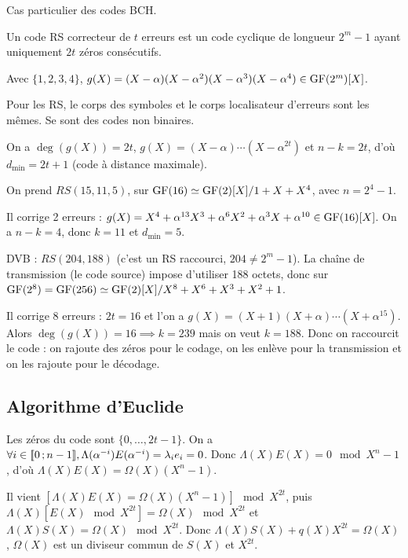 Cas particulier des codes BCH.

\begin{defn}
	Un code RS correcteur de $t$ erreurs est un code cyclique de longueur $2^m - 1$ ayant uniquement $2t$ zéros consécutifs.
\end{defn}

\begin{ex}
	Avec $\{ 1, 2, 3, 4 \}$, $g(X) = (X - \alpha)(X - \alpha^2)(X - \alpha^3)(X - \alpha^4) \in \mathrm{GF}(2^m)[X]$.
\end{ex}

Pour les RS, le corps des symboles et le corps localisateur d'erreurs sont les mêmes.
Se sont des codes non binaires.

On a $\deg(g(X)) = 2t$, $g(X) = (X - \alpha) \cdots (X - \alpha^{2t})$ et $n - k = 2t$, d'où $d_{\min} = 2t + 1$ (code à distance maximale).

\begin{ex}
	On prend $RS(15,11,5)$, sur $\mathrm{GF}(16) \simeq \mathrm{GF}(2)[X] / 1 + X + X^4$, avec $n = 2^4 - 1$.
	
	Il corrige 2 erreurs : $g(X) = X^4 + \alpha^{13} X^3 + \alpha^6 X^2 + \alpha^3 X + \alpha^{10} \in \mathrm{GF}(16)[X]$.
	On a $n - k = 4$, donc $k = 11$ et $d_{\min} = 5$.
\end{ex}

\begin{ex}
	DVB : $RS(204,188)$ (c'est un RS raccourci, $204 \neq 2^m - 1$).
	La chaîne de transmission (le code source) impose d'utiliser 188 octets, donc sur $\mathrm{GF}(2^8) = \mathrm{GF}(256) \simeq \mathrm{GF}(2)[X] / X^8 + X^6 + X^3 + X^2 + 1$.
	
	Il corrige 8 erreurs : $2t = 16$ et l'on a $g(X) = (X + 1)(X + \alpha) \cdots (X + \alpha^{15})$.
	Alors $\deg(g(X)) = 16 \implies k = 239$ mais on veut $k = 188$.
	Donc on raccourcit le code : on rajoute des zéros pour le codage, on les enlève pour la transmission et on les rajoute pour le décodage.
\end{ex}


\subsection{Algorithme d'Euclide}

	Les zéros du code sont $\{ 0,\ldots,2t - 1 \}$.
	On a $\forall i \in \mathopen{}\mathclose{\left[\![0\mathclose{}\mathpunct{};n - 1\right]\!]}, \Lambda(\alpha^{-i}) E(\alpha^{-i}) = \lambda_i e_i = 0$.
	Donc $\Lambda(X) E(X) = 0 \mod{X^n - 1}$, d'où $\Lambda(X)E(X) = \Omega(X) (X^n - 1)$.
	
	Il vient $[\Lambda(X)E(X) = \Omega(X) (X^n - 1)] \mod{X^{2t}}$, puis $\Lambda(X) [E(X) \mod{X^{2t}}] = \Omega(X) \mod{X^{2t}}$ et $\Lambda(X) S(X) = \Omega(X) \mod{X^{2t}}$.
	Donc $\Lambda(X)S(X) + q(X)X^{2t} = \Omega(X)$, $\Omega(X)$ est un diviseur commun de $S(X)$ et $X^{2t}$.


